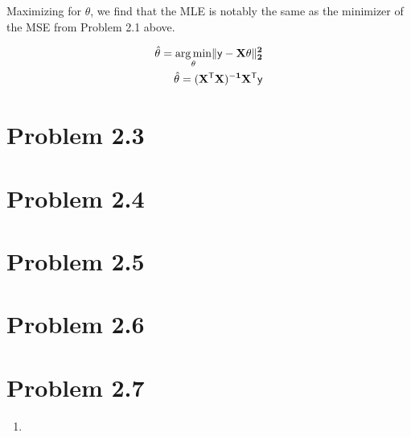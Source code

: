 \documentclass{article}
\begin{document}
Maximizing for $\theta$, we find that the MLE is notably the same as the minimizer of the MSE from Problem 2.1 above.

\begin{align*}
  \hat{\theta} = \underset{\theta}{\arg\min} \Vert \bf{\sf{y}}  - \bf{X}  \theta \Vert ^2_2 \\
  \hat{\theta} = (\bf{X}^{\sf{T}}\bf{X})^{-1}\bf{X}^{\sf{T}}\bf{\sf{y}}
\end{align*}



\section*{Problem 2.3}

\section*{Problem 2.4}

\section*{Problem 2.5}

\section*{Problem 2.6}

\section*{Problem 2.7}
\begin{enumerate}[label=(\alph*)]
  \item 
\end{enumerate}
\end{document}
